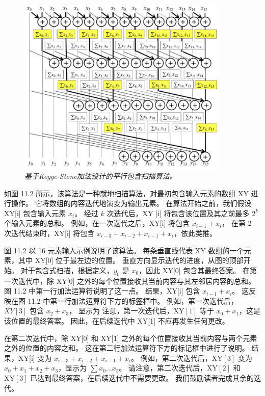 \begin{figure}[H]
	\centering
	\includegraphics[width=0.9\textwidth]{figs/F11.2.png}
	\caption{\textit{基于Kogge-Stone加法设计的平行包含扫描算法。}}
\end{figure}

如图 11.2 所示，该算法是一种就地扫描算法，对最初包含输入元素的数组 XY 进行操作。 
它将数组的内容迭代地演变为输出元素。 在算法开始之前，我们假设 XY[i] 包含输入元素 $x_{i}$。 
经过 $k$ 次迭代后，$\mathrm{XY}$ [i] 将包含该位置及其之前最多 $2^{k}$ 个输入元素的总和。 
例如，在一次迭代之后，XY[i] 将包含 $x_{i-1}+x_{i}$，
在第 2 次迭代结束时，XY[i] 将包含 $x_{i-3}+x_{ i-2}+x_{i-1}+x_{i}$，依此类推。

图 11.2 以 16 元素输入示例说明了该算法。 每条垂直线代表 XY 数组的一个元素，其中 XY[0] 位于最左边的位置。 
垂直方向显示迭代的进度，从图的顶部开始。 对于包含式扫描，根据定义，$y_{0}$ 是 $x_{0}$，因此 XY[0] 包含其最终答案。 
在第一次迭代中，除 XY[0] 之外的每个位置接收其当前内容与其左邻居内容的总和。 图 11.2 中第一行加法运算符说明了这一点。 
结果，XY[i] 包含 $x_{i-1}+x_{i}$。 这反映在图 11.2 中第一行加法运算符下方的标签框中。 
例如，第一次迭代后，$X Y[3]$ 包含 $x_{2}+x_{3}$，
显示为 注意，第一次迭代后，$\mathrm{XY}[1]$ 等于 $ x_{0}+x_{1}$，这是该位置的最终答案。 
因此，在后续迭代中 XY[1] 不应再发生任何更改。

在第二次迭代中，除 XY[0] 和 XY[1] 之外的每个位置接收其当前内容与两个元素之外的位置的内容之和。 
这在第二行加法运算符下方的标记框中进行了说明。 结果，XY[i] 变为 $x_{i-3}+x_{i-2}+x_{i-1}+x_{i}$。 
例如，第二次迭代后，$\mathrm{XY}[3]$ 变为 $x_{0}+x_{1}+x_{2}+x_{3}$，显示为 $\sum x_{0} \ldots x_{3}$。 
请注意，第二次迭代后，$\mathrm{XY}[2]$ 和 $\mathrm{XY}[3]$ 已达到最终答案，在后续迭代中不需要更改。 
我们鼓励读者完成其余的迭代。

